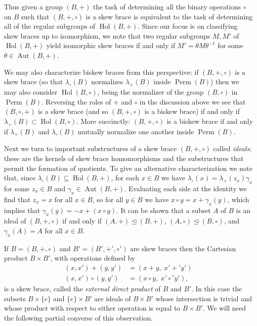 \documentclass[reqno]{amsart}
\theoremstyle{definition}
\DeclareMathOperator{\Perm}{\mbox{Perm}}
\DeclareMathOperator{\Hol}{\mbox{Hol}}
\DeclareMathOperator{\Aut}{\mbox{Aut}}
\begin{document}
Thus given a group $ (B,+) $ the task of determining all the binary operations $ \circ $ on $ B $ such that $ (B,+,\circ) $ is a skew brace is equivalent to the task of determining all of the regular subgroups of $ \Hol(B,+) $. Since our focus is on classifying skew braces up to isomorphism, we note that two regular subgroups $ M, M' $ of $ \Hol(B,+) $ yield isomorphic skew braces if and only if $ M' = \theta M \theta^{-1} $ for some $ \theta \in \Aut(B,+) $. 

We may also characterize biskew braces from this perspective: if $ (B,+,\circ) $ is a skew brace (so that $ \lambda_{\circ}(B) $ normalizes $ \lambda_{+}(B) $ inside $ \Perm(B) $) then we may also consider $ \Hol(B,\circ) $, being the normalizer of the group $ (B,\circ) $ in $ \Perm(B) $. Reversing the roles of $ + $ and $ \circ $ in the discussion above we see that $ (B,\circ,+) $ is a skew brace (and so $ (B,+,\circ) $ is a biskew brace) if and only if $ \lambda_{+}(B) \subset \Hol(B,\circ) $. More succinctly: $ (B,+,\circ) $ is a biskew brace if and only if $ \lambda_{+}(B) $ and $ \lambda_{\circ}(B) $ mutually normalize one another inside $ \Perm(B) $. 

Next we turn to important substructures of a skew brace $ (B,+,\circ) $ called \textit{ideals}; these are the kernels of skew brace homomorphisms and the substructures that permit the formation of quotients. To give an alternative characterization we note that, since $ \lambda_{\circ}(B) \subseteq \Hol(B,+) $, for each $ x \in B $ we have $ \lambda_{\circ}(x) = \lambda_{+}(z_{x}) \gamma_{x} $ for some $ z_{x} \in B $ and $ \gamma_{x} \in \Aut(B,+) $. Evaluating each side at the identity we find that $ z_{x}=x $ for all $ x \in B $, so for all $ y \in B $ we have  $ x \circ y = x + \gamma_{x}(y) $, which implies that $ \gamma_{x}(y) = -x + (x \circ y) $. It can be shown that a subset $ A $ of $ B $ is an ideal of $ (B,+,\circ) $ if and only if $ (A,+) \trianglelefteq (B,+) $, $ (A,\circ) \trianglelefteq (B,\circ) $, and $ \gamma_{x}(A)=A $ for all $ x \in B $.

If $ B=(B,+,\circ) $ and $ B'=(B',+',\circ') $ are skew braces then the Cartesian product $ B \times B' $, with operations defined by
\begin{align}
(x,x') + (y,y') &= (x + y, \; x' +' y')  \label{align_direct_product_cdot} \\
(x,x') \circ (y,y') &= (x \circ y, \; x' \circ' y'), \label{align_direct_product_circ}
\end{align}
is a skew brace, called the \textit{external direct product} of $ B $ and $ B' $. In this case the subsets $ B \times \{ e \} $ and $ \{ e \} \times B' $ are ideals of $ B \times B' $ whose intersection is trivial and whose product with respect to either operation is equal to $ B \times B' $. We will need the following partial converse of this observation.
\end{document}
